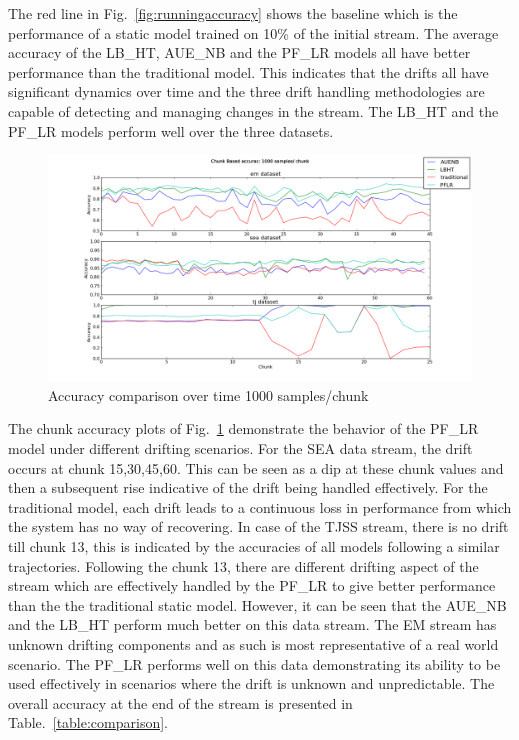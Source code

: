 \documentclass[conference]{IEEEtran}
\begin{document}
The red line in Fig.~\ref{fig:runningaccuracy} shows the baseline which is the performance of a static model trained on 10\% of the initial stream. The average accuracy of the LB\_HT, AUE\_NB and the PF\_LR models all have better performance than the traditional model. This indicates that the drifts all have significant dynamics over time and the three drift handling  methodologies are capable of detecting and managing changes in the stream. The LB\_HT and the PF\_LR models perform well over the three datasets. 


\begin{figure}
\captionsetup{justification=centering}
\centering
\includegraphics[scale=0.2]{fig/chunk_accuracy.png}
\caption{Accuracy comparison over time 1000 samples/chunk}
\label{fig:chunkaccuracy} 
\end{figure}

The chunk accuracy plots of Fig.~\ref{fig:chunkaccuracy} demonstrate the behavior of the PF\_LR model under different drifting scenarios. For the SEA data stream, the drift occurs at chunk 15,30,45,60. This can be seen as a dip at these chunk values and then a subsequent rise indicative of the drift  being handled effectively. For the traditional model, each drift leads to a continuous loss in performance from  which the system has no way of recovering. In case of the TJSS stream, there is no drift till chunk 13, this is indicated by the accuracies of all models following a similar trajectories. Following the chunk 13, there are different drifting aspect of the stream which are effectively handled by the PF\_LR to give better performance than the the traditional static model. However, it can be seen that the AUE\_NB and the LB\_HT perform much better on this data stream. The EM stream has unknown drifting components and as such is most representative of a real world scenario. The PF\_LR performs well on this data demonstrating its ability to be used effectively in scenarios where the drift is unknown and unpredictable. The overall accuracy at the end of the stream is presented in Table.~\ref{table:comparison}.
\end{document}
